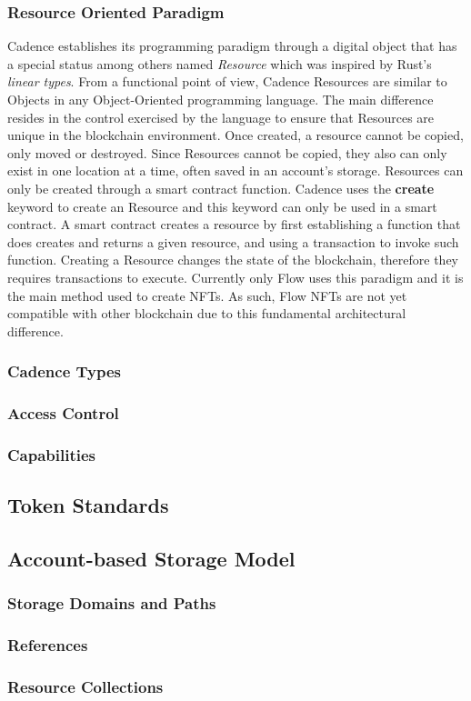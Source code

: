 \documentclass[../access.tex]{subfiles}
\begin{document}
\subsubsection{Resource Oriented Paradigm}
Cadence establishes its programming paradigm through a digital object that has a special status among others named \textit{Resource} which was inspired by Rust's \textit{linear types}. From a functional point of view, Cadence Resources are similar to Objects in any Object-Oriented programming language. The main difference resides in the control exercised by the language to ensure that Resources are unique in the blockchain environment. Once created, a resource cannot be copied, only moved or destroyed. Since Resources cannot be copied, they also can only exist in one location at a time, often saved in an account's storage. Resources can only be created through a smart contract function. Cadence uses the \textbf{create} keyword to create an Resource and this keyword can only be used in a smart contract. A smart contract creates a resource by first establishing a function that does creates and returns a given resource, and using a transaction to invoke such function. Creating a Resource changes the state of the blockchain, therefore they requires transactions to execute. Currently only Flow uses this paradigm and it is the main method used to create NFTs. As such, Flow NFTs are not yet compatible with other blockchain due to this fundamental architectural difference.

\subsubsection{Cadence Types}
\subsubsection{Access Control}
\subsubsection{Capabilities}

\subsection{Token Standards}

\subsection{Account-based Storage Model}
\subsubsection{Storage Domains and Paths}
\subsubsection{References}
\subsubsection{Resource Collections}
\end{document}
